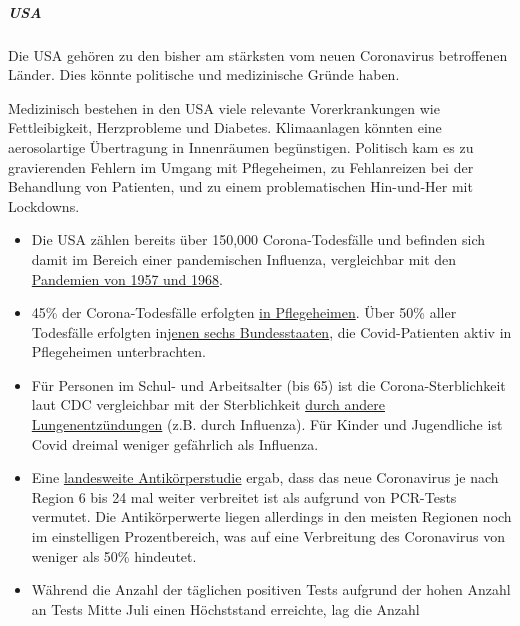 \hypertarget{usa}{%
\subparagraph{\texorpdfstring{\textbf{USA}}{USA}}\label{usa}}

Die USA gehören zu den bisher am stärksten vom neuen Coronavirus
betroffenen Länder. Dies könnte politische und medizinische Gründe
haben.

Medizinisch bestehen in den USA viele relevante Vorerkrankungen wie
Fettleibigkeit, Herzprobleme und Diabetes. Klimaanlagen könnten eine
aerosolartige Übertragung in Innenräumen begünstigen. Politisch kam es
zu gravierenden Fehlern im Umgang mit Pflegeheimen, zu Fehlanreizen bei
der Behandlung von Patienten, und zu einem problematischen Hin-und-Her
mit Lockdowns.

\begin{itemize}
\tightlist
\item
  Die USA zählen bereits über 150,000 Corona-Todesfälle und befinden
  sich damit im Bereich einer pandemischen Influenza, vergleichbar mit
  den
  \href{https://www.visualcapitalist.com/history-of-pandemics-deadliest/}{Pandemien
  von 1957 und 1968}.
\item
  45\% der Corona-Todesfälle erfolgten
  \href{https://freopp.org/the-covid-19-nursing-home-crisis-by-the-numbers-3a47433c3f70}{in
  Pflegeheimen}. Über 50\% aller Todesfälle erfolgten
  in\href{https://twitter.com/pdubdev/status/1280195926238261248/photo/1}{jenen
  sechs Bundesstaaten}, die Covid-Patienten aktiv in Pflegeheimen
  unterbrachten.
\item
  Für Personen im Schul- und Arbeitsalter (bis 65) ist die
  Corona-Sterblichkeit laut CDC vergleichbar mit der Sterblichkeit
  \href{https://childrenshealthdefense.org/news/if-covid-fatalities-were-90-2-lower-how-would-you-feel-about-schools-reopening/}{durch
  andere Lungenentzündungen} (z.B. durch Influenza). Für Kinder und
  Jugendliche ist Covid dreimal weniger gefährlich als Influenza.
\item
  Eine
  \href{https://www.the-scientist.com/news-opinion/largest-seroprevalence-study-in-us-shows-vast-covid-19-undercount-67762}{landesweite
  Antikörperstudie} ergab, dass das neue Coronavirus je nach Region 6
  bis 24 mal weiter verbreitet ist als aufgrund von PCR-Tests vermutet.
  Die Antikörperwerte liegen allerdings in den meisten Regionen noch im
  einstelligen Prozentbereich, was auf eine Verbreitung des Coronavirus
  von weniger als 50\% hindeutet.
\item
  Während die Anzahl der täglichen positiven Tests aufgrund der hohen
  Anzahl an Tests Mitte Juli einen Höchststand erreichte, lag die Anzahl

\end{itemize}
